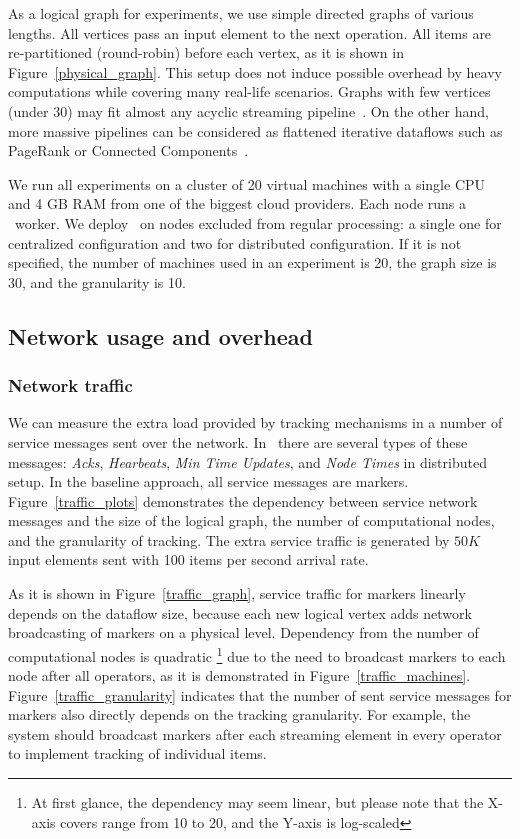As a logical graph for experiments, we use simple directed graphs of various lengths. All vertices pass an input element to the next operation. All items are re-partitioned (round-robin) before each vertex, as it is shown in Figure~\ref{physical_graph}. This setup does not induce possible overhead by heavy computations while covering many real-life scenarios. Graphs with few vertices (under 30) may fit almost any acyclic streaming pipeline~\cite{akidau2018streaming}. On the other hand, more massive pipelines can be considered as flattened iterative dataflows such as PageRank or Connected Components~\cite{Murray:2013:NTD:2517349.2522738, xu2016efficient}.

We run all experiments on a cluster of 20 virtual machines with a single CPU and 4 GB RAM from one of the biggest cloud providers. Each node runs a \FlameStream\ worker. We deploy \tracker\ on nodes excluded from regular processing: a single one for centralized configuration and two for distributed configuration. If it is not specified, the number of machines used in an experiment is 20, the graph size is 30, and the granularity is 10. 

\subsection{Network usage and overhead} \label{overhead}

\subsubsection{Network traffic}

We can measure the extra load provided by tracking mechanisms in a number of service messages sent over the network. In \tracker\ there are several types of these messages: {\em Acks}, {\em Hearbeats}, {\em Min Time Updates}, and {\em Node Times} in distributed setup. In the baseline approach, all service messages are markers. Figure~\ref{traffic_plots} demonstrates the dependency between service network messages and the size of the logical graph, the number of computational nodes, and the granularity of tracking. The extra service traffic is generated by $50K$ input elements sent with 100 items per second arrival rate. 

As it is shown in Figure~\ref{traffic_graph}, service traffic for markers linearly depends on the dataflow size, because each new logical vertex adds network broadcasting of markers on a physical level. Dependency from the number of computational nodes is quadratic \footnote{At first glance, the dependency may seem linear, but please note that the X-axis covers range from 10 to 20, and the Y-axis is log-scaled} due to the need to broadcast markers to each node after all operators, as it is demonstrated in Figure~\ref{traffic_machines}. Figure~\ref{traffic_granularity} indicates that the number of sent service messages for markers also directly depends on the tracking granularity. For example, the system should broadcast markers after each streaming element in every operator to implement tracking of individual items. 

